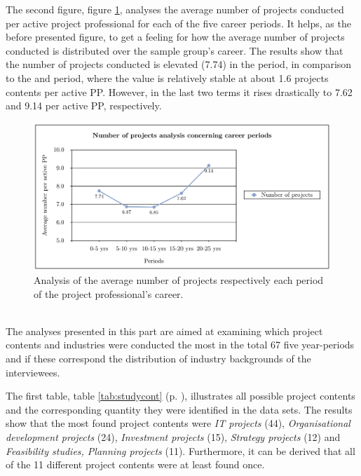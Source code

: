 The second figure, figure \ref{fig:analy_NP}, analyses the average number of projects conducted per active project professional for each of the five career periods. It helps, as the before presented figure, to get a feeling for how the average number of projects conducted is distributed over the sample group's career. The results show that the number of projects conducted is elevated (7.74) in the  period, in comparison to the  and  period, where the value is relatively stable at about 1.6 projects contents per active PP. However, in the last two terms it rises drastically to 7.62 and 9.14 per active PP, respectively.\\


\begin{figure}[!hbt]
    \captionsetup{font=small}
  \centering
  \includegraphics[width=.6\columnwidth]{figures/Analysis_NP.png}
  \caption[Analysis of the number of projects respectively the PP's career]{Analysis of the average number of projects respectively each period of the project professional's career.}
  \label{fig:analy_NP}
\end{figure}




\\[.1cm]
The analyses presented in this part are aimed at examining which project contents and industries were conducted the most in the total 67 five year-periods and if these correspond the distribution of industry backgrounds of the interviewees.

The first table, table \ref{tab:studycont} 
(p. \pageref{tab:studycont}), illustrates all possible project contents and the corresponding quantity they were identified in the data sets. The results show that the most found project contents were \textit{IT projects} (44), \textit{Organisational development projects} (24), \textit{Investment projects} (15), \textit{Strategy projects} (12) and \textit{Feasibility studies, Planning projects} (11). Furthermore, it can be derived that all of the 11 different project contents were at least found once.\\



